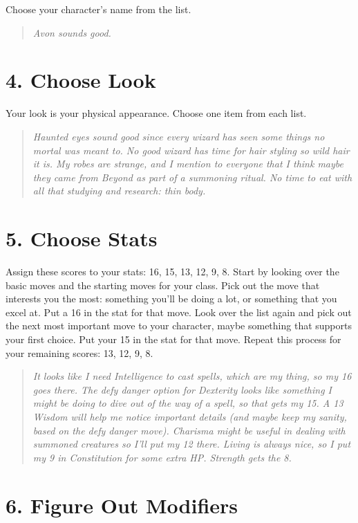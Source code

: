 Choose your character's name from the list.

\begin{quote}
\emph{Avon sounds good.}
\end{quote}
\section{4. Choose Look}

Your look is your physical appearance. Choose one item from each list.

\begin{quote}
\emph{Haunted eyes sound good since every wizard has seen some things no mortal was meant to. No good wizard has time for hair styling so wild hair it is. My robes are strange, and I mention to everyone that I think maybe they came from Beyond as part of a summoning ritual. No time to eat with all that studying and research: thin body.}
\end{quote}
\section{5. Choose Stats}

Assign these scores to your stats: 16, 15, 13, 12, 9, 8. Start by looking over the basic moves and the starting moves for your class. Pick out the move that interests you the most: something you'll be doing a lot, or something that you excel at. Put a 16 in the stat for that move. Look over the list again and pick out the next most important move to your character, maybe something that supports your first choice. Put your 15 in the stat for that move. Repeat this process for your remaining scores: 13, 12, 9, 8.

\begin{quote}
\emph{It looks like I need Intelligence to cast spells, which are my thing, so my 16 goes there. The defy danger option for Dexterity looks like something I might be doing to dive out of the way of a spell, so that gets my 15. A 13 Wisdom will help me notice important details (and maybe keep my sanity, based on the defy danger move). Charisma might be useful in dealing with summoned creatures so I'll put my 12 there. Living is always nice, so I put my 9 in Constitution for some extra HP\@. Strength gets the 8.}
\end{quote}
\section{6. Figure Out Modifiers}

